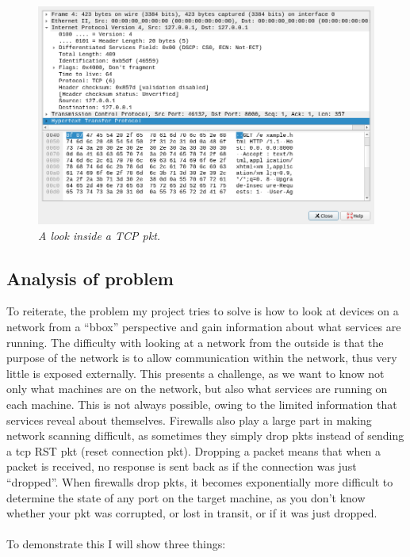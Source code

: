 \documentclass[titlepage]{article}
\let\Oldsubsection\subsection{}
\renewcommand{\subsection}{\FloatBarrier\Oldsubsection}
\begin{document}
\begin{figure}[H]
  \centering
  \includegraphics[width=\textwidth]{deconstructed_packet.png}
  \caption{\textit{%
    A look inside a TCP \gls{pkt}.
}}\label{deconstructed}
\end{figure}

\lstset{language=HTML}
  

\clearpage
\subsection{Analysis of problem}

To reiterate, the problem my project tries to solve is how to look at devices on a network from a 
``\gls{bbox}'' perspective and gain information about what \glspl{service} are running.
The difficulty with looking at a network from the outside is that the purpose of the network is to 
allow communication within the network, thus very little is exposed externally. This presents a 
challenge, as we want to know not only what machines are on the network, but also what
services are running on each machine.
This is not always possible, owing to the limited information that \glspl{service} reveal about 
themselves. Firewalls also play a large part in making network scanning difficult, as sometimes they 
simply drop \glspl{pkt} instead of sending a \gls{tcp} RST \gls{pkt} (reset connection \gls{pkt}). 
Dropping a packet means that when a packet is received, no response is sent back \textendash{}
as if the connection was just ``dropped''.
When firewalls drop \glspl{pkt}, it becomes exponentially more difficult to determine the
state of any port on the target machine, as you don't know whether 
your \gls{pkt} was corrupted, or lost in transit, or if it was just dropped.
 \\\\ To demonstrate this 
I will show three things:
\end{document}
